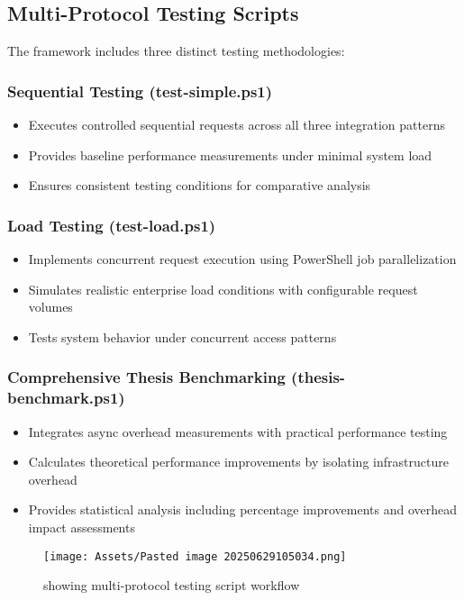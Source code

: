 \subsection{Multi-Protocol Testing Scripts}

The framework includes three distinct testing methodologies:

\subsubsection{Sequential Testing (test-simple.ps1)}
\begin{itemize}
    \item Executes controlled sequential requests across all three integration patterns
    \item Provides baseline performance measurements under minimal system load
    \item Ensures consistent testing conditions for comparative analysis
\end{itemize}

\subsubsection{Load Testing (test-load.ps1)}
\begin{itemize}
    \item Implements concurrent request execution using PowerShell job parallelization
    \item Simulates realistic enterprise load conditions with configurable request volumes
    \item Tests system behavior under concurrent access patterns
\end{itemize}

\subsubsection{Comprehensive Thesis Benchmarking (thesis-benchmark.ps1)}
\begin{itemize}
    \item Integrates async overhead measurements with practical performance testing
    \item Calculates theoretical performance improvements by isolating infrastructure overhead
    \item Provides statistical analysis including percentage improvements and overhead impact assessments
\end{itemize}

\begin{figure}[H]
    \centering
    \texttt{[image: Assets/Pasted image 20250629105034.png]}
    \caption{showing multi-protocol testing script workflow}
\end{figure}


